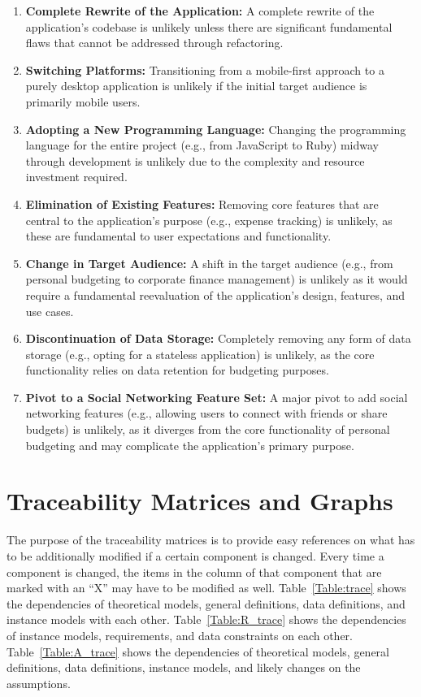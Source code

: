 \documentclass[12pt]{article}
\begin{document}
\begin{enumerate}[label=ULC\arabic*]
	\item \textbf{Complete Rewrite of the Application:} A complete rewrite of the
	application's codebase is unlikely unless there are significant fundamental
	flaws that cannot be addressed through refactoring.
	\item \textbf{Switching Platforms:} Transitioning from a mobile-first approach
	to a purely desktop application is unlikely if the initial target audience is
	primarily mobile users.
	\item \textbf{Adopting a New Programming Language:} Changing the programming
	language for the entire project (e.g., from JavaScript to Ruby) midway through
	development is unlikely due to the complexity and resource investment
	required.
	\item \textbf{Elimination of Existing Features:} Removing core features that
	are central to the application's purpose (e.g., expense tracking) is unlikely,
	as these are fundamental to user expectations and functionality.
	\item \textbf{Change in Target Audience:} A shift in the target audience
	(e.g., from personal budgeting to corporate finance management) is unlikely as
	it would require a fundamental reevaluation of the application's design,
	features, and use cases.
	\item \textbf{Discontinuation of Data Storage:} Completely removing any form
	of data storage (e.g., opting for a stateless application) is unlikely, as the
	core functionality relies on data retention for budgeting purposes.
	\item \textbf{Pivot to a Social Networking Feature Set:} A major pivot to add
	social networking features (e.g., allowing users to connect with friends or
	share budgets) is unlikely, as it diverges from the core functionality of
	personal budgeting and may complicate the application's primary purpose.
\end{enumerate}

\newpage

\section{Traceability Matrices and Graphs}

The purpose of the traceability matrices is to provide easy references on what
has to be additionally modified if a certain component is changed.  Every time a
component is changed, the items in the column of that component that are marked
with an ``X'' may have to be modified as well.  Table~\ref{Table:trace} shows the
dependencies of theoretical models, general definitions, data definitions, and
instance models with each other. Table~\ref{Table:R_trace} shows the
dependencies of instance models, requirements, and data constraints on each
other. Table~\ref{Table:A_trace} shows the dependencies of theoretical models,
general definitions, data definitions, instance models, and likely changes on
the assumptions.
\end{document}

